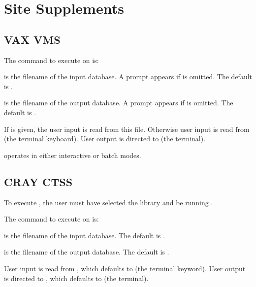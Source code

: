 \chapter{Site Supplements} \label{appx:site}

\section{VAX VMS}

The command to execute \caps{\PROGRAM} on  is:
\begin{center}
\end{center}

 is the filename of the input \exo{}
database. A prompt appears if  is omitted. The
default is .

 is the filename of the output \exo{}
database. A prompt appears if  is omitted. The
default is .

If  is given, the user input is read from this
file. Otherwise user input is read from  (the terminal
keyboard). User output is directed to  (the terminal).

\caps{\PROGRAM} operates in either interactive or batch modes.

\section{CRAY CTSS}

To execute \caps{\PROGRAM}, the user must have selected the 
library and be running .

The command to execute \caps{\PROGRAM} on  is:
\begin{center}
\end{center}

 is the filename of the input \exo{}
database. The default is .

 is the filename of the output \exo{}
database. The default is .

User input is read from , which defaults to  (the
terminal keyword). User output is directed to , which
defaults to  (the terminal).
